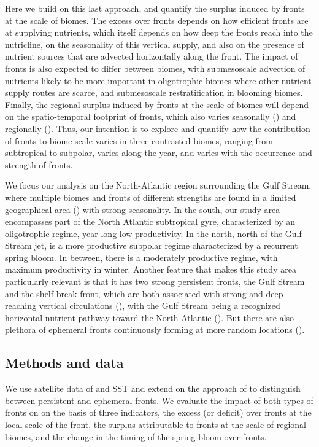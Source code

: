 Here we build on this last approach, and quantify the surplus  induced by fronts at the scale of biomes.
The excess  over fronts depends on how efficient fronts are at supplying nutrients, which itself depends on how deep the fronts reach into the nutricline, on the seasonality of this vertical supply, and also on the presence of nutrient sources that are advected horizontally along the front.
The impact of fronts is also expected to differ between biomes, with submesoscale advection of nutrients likely to be more important in oligotrophic biomes where other nutrient supply routes are scarce, and submesoscale restratification in blooming biomes.
Finally, the regional surplus  induced by fronts at the scale of biomes will depend on the spatio-temporal footprint of fronts, which also varies seasonally (\cite{callies_2015}) and regionally (\cite{mauzole_2022}).
Thus, our intention is to explore and quantify how the contribution of fronts to biome-scale  varies in three contrasted biomes, ranging from subtropical to subpolar, varies along the year, and varies with the occurrence and strength of fronts.

We focus our analysis on the North-Atlantic region surrounding the Gulf Stream, where multiple biomes and fronts of different strengths are found in a limited geographical area (\cite{bock_2022}) with strong seasonality.
In the south, our study area encompasses part of the North Atlantic subtropical gyre, characterized by an oligotrophic regime, year-long low productivity.
In the north, north of the Gulf Stream jet, is a more productive subpolar regime characterized by a recurrent spring bloom.
In between, there is a moderately productive regime, with maximum productivity in winter.
Another feature that makes this study area particularly relevant is that it has two strong persistent fronts, the Gulf Stream and the shelf-break front, which are both associated with strong and deep-reaching vertical circulations (\cite{flagg_2006, liao_2022}), with the Gulf Stream being a recognized horizontal nutrient pathway toward the North Atlantic (\cite{pelegri_1996, williams_2011}).
But there are also plethora of ephemeral fronts continuously forming at more random locations (\cite{drushka_2019, sanchez-rios_2020}).


\subsection{Methods and data}

We use satellite data of  and SST and extend on the approach of \textcite{liu_2016} to distinguish between persistent and ephemeral fronts.
We evaluate the impact of both types of fronts on  on the basis of three indicators, the excess (or deficit)  over fronts at the local scale of the front, the surplus  attributable to fronts at the scale of regional biomes, and the change in the timing of the  spring bloom over fronts.


